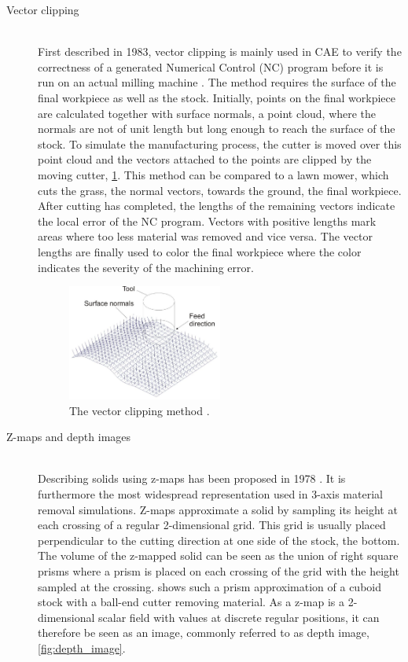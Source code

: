 \begin{description}
	\item[Vector clipping] \hfill \\
	First described in 1983, vector clipping is mainly used in CAE to verify the correctness of a generated Numerical Control (NC) program before it is run on an actual milling machine \cite{vector_clipping}.
	The method requires the surface of the final workpiece as well as the stock.
	Initially, points on the final workpiece are calculated together with surface normals, \ie a point cloud, where the normals are not of unit length but long enough to reach the surface of the stock.
	To simulate the manufacturing process, the cutter is moved over this point cloud and the vectors attached to the points are clipped by the moving cutter, \cf \cref{fig:vector_clipping}.
	This method can be compared to a lawn mower, which cuts the grass, \ie the normal vectors, towards the ground, \ie the final workpiece.
	After cutting has completed, the lengths of the remaining vectors indicate the local error of the NC program.
	Vectors with positive lengths mark areas where too less material was removed and vice versa.
	The vector lengths are finally used to color the final workpiece where the color indicates the severity of the machining error.

	\begin{figure}[H]
		\centering
		\includegraphics[width=0.5\textwidth]{images/vector_clipping}
		\caption[Vector clipping]{
			The vector clipping method \cite{virtual_machining_review}.
		}
		\label{fig:vector_clipping}
	\end{figure}


	\item[Z-maps and depth images] \hfill \\
	Describing solids using z-maps has been proposed in 1978 \cite{zmap}.
	It is furthermore the most widespread representation used in 3-axis material removal simulations.
	Z-maps approximate a solid by sampling its height at each crossing of a regular 2-dimensional grid.
	This grid is usually placed perpendicular to the cutting direction at one side of the stock, \eg the bottom.
	The volume of the z-mapped solid can be seen as the union of right square prisms where a prism is placed on each crossing of the grid with the height sampled at the crossing.
	 shows such a prism approximation of a cuboid stock with a ball-end cutter removing material.
	As a z-map is a 2-dimensional scalar field with values at discrete regular positions, it can therefore be seen as an image, commonly referred to as depth image, \cf \cref{fig:depth_image}.


\end{description}
